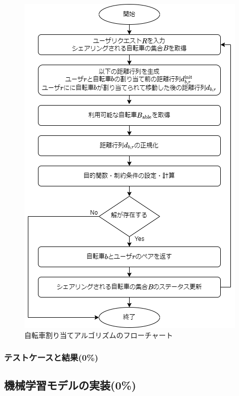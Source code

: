           \begin{figure}[htbp]
            \centering
            \includegraphics[scale=0.54]
            {figures/algorithmImplementation.png}
            \caption{自転車割り当てアルゴリズムのフローチャート}
            \label{fig:自転車割り当てアルゴリズムのフローチャート}
          \end{figure}

      \subsubsection{テストケースと結果(0\%)}
        \label{sec:テストケースと結果}
          \par  
  
  \subsection{機械学習モデルの実装(0\%)}
    \label{sec:機械学習モデルの実装}
      \par 
      
